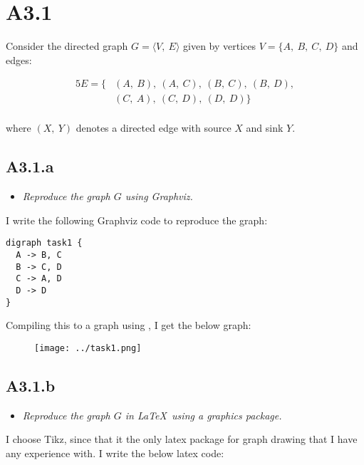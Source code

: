 \newpage
\section{A3.1}

Consider the directed graph $G = \langle V,\ E\rangle$ given by vertices $V =
\{A,\ B,\ C,\ D\}$ and edges:

\begin{alignat*}{5}
  E = \{&(A,\ B),\ (A,\ C),\ (B,\ C),\ (B,\ D),\\[4pt]
        &(C,\ A),\ (C,\ D),\ (D,\ D)\}\\[4pt]
\end{alignat*}

where $(X,\ Y)$ denotes a directed edge with source $X$ and sink $Y$.

\subsection{A3.1.a}

\begin{itemize}
  \item \emph{Reproduce the graph $G$ using Graphviz.}
\end{itemize}

I write the following Graphviz code to reproduce the graph:

\begin{verbatim}
digraph task1 {
  A -> B, C
  B -> C, D
  C -> A, D
  D -> D
}
\end{verbatim}

Compiling this to a graph using , I get the below graph:

\begin{figure}[H]
  \centering

  \texttt{[image: ../task1.png]}
\end{figure}

\sectend


\newpage
\subsection{A3.1.b}

\begin{itemize}
  \item \emph{Reproduce the graph $G$ in \LaTeX ~using a graphics package.}
\end{itemize}

I choose Tikz, since that it the only latex package for graph drawing that I
have any experience with. I write the below latex code:

